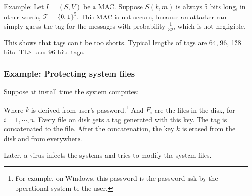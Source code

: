 \documentclass[12pt]{book}
\begin{document}
Example: Let $I=(S,V)$ be a MAC. Suppose $S(k,m)$ is always 5 bits long, in other words, $\mathcal{T}=\{0,1\}^{5}$. This MAC is not secure, because an attacker can simply guess the tag for the messages with probability $\frac{1}{32}$, which is not negligible.

This shows that tags can't be too shorts. Typical lengths of tags are 64, 96, 128 bits. TLS uses 96 bits tags.

\subsubsection{Example: Protecting system files}
Suppose at install time the system computes:
\begin{center}
\end{center}Where $k$ is derived from user's password.\footnote{For example, on Windows, this password is the password ask by the operational system to the user.} And $F_{i}$ are the files in the disk, for $i=1,\cdots,n$. Every file on disk gets a tag generated with this key. The tag is concatenated to the file. After the concatenation, the key $k$ is erased from the disk and from everywhere.

Later, a virus infects the systems and tries to modify the system files.
\end{document}

